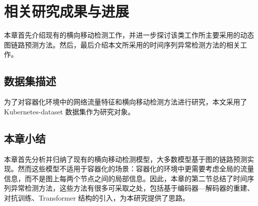 \chapter{相关研究成果与进展}{
{
\let\cleardoublepage\relax
}

本章首先介绍现有的横向移动检测工作，并进一步探讨该类工作所主要采用的动态图链路预测方法。然后，最后介绍本文所采用的时间序列异常检测方法的相关工作。



\section{数据集描述}

为了对容器化环境中的网络流量特征和横向移动检测方法进行研究，本文采用了 Kubernetes-dataset 数据集\citep{sever2023kubernetes}作为研究对象。

\section{本章小结}

本章首先分析并归纳了现有的横向移动检测模型，大多数模型基于图的链路预测实现。然而这些模型不适用于容器化的场景：容器化的环境中更需要考虑全局的流量信息，而不是图上每两个节点之间的局部信息。因此，本章的第二节总结了时间序列异常检测方法，这些方法有很多可采取之处，包括基于编码器—解码器的重建、对抗训练、Transformer 结构的引入，为本研究提供了思路。
}